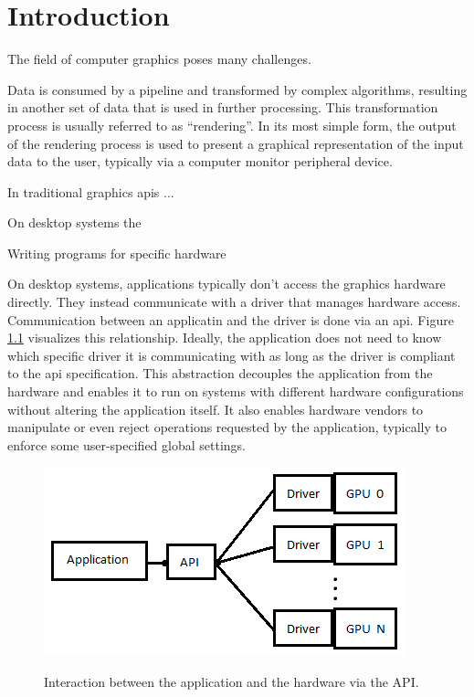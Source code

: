 
\chapter{Introduction}
\label{cha:Introduction}

  The field of computer graphics poses many challenges.

  Data is consumed by a pipeline and transformed by complex algorithms, resulting in another set of data that is used in further processing. This transformation process is usually referred to as ``rendering''. In its most simple form, the output of the rendering process is used to present a graphical representation of the input data to the user, typically via a computer monitor peripheral device.

  In traditional graphics \acrshort{api}s ...

  On desktop systems the

  Writing programs for specific hardware



  On desktop systems, applications typically don't access the graphics hardware directly. They instead communicate with a driver that manages hardware access. Communication between an applicatin and the driver is done via an \acrfull{api}. Figure \ref{fig:AppApiDriverOverview} visualizes this relationship. Ideally, the application does not need to know which specific driver it is communicating with as long as the driver is compliant to the \acrshort{api} specification. This abstraction decouples the application from the hardware and enables it to run on systems with different hardware configurations without altering the application itself. It also enables hardware vendors to manipulate or even reject operations requested by the application, typically to enforce some user-specified global settings. 

  \begin{figure}
    \caption{Interaction between the application and the hardware via the API.}
    \centering
    \includegraphics{Main/Images/Application_API_Driver_Overview.png}
    \label{fig:AppApiDriverOverview}
  \end{figure}

